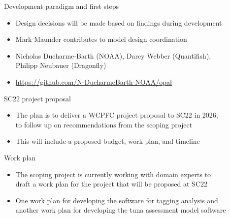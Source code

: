 \documentclass[aspectratio=169]{beamer}
\begin{document}

\begin{frame}{Development paradigm and first steps}\small
  \begin{itemize}
    \item[-] Design decisions will be made based on findings during
    development\\[1.6ex]
    \item[-] Mark Maunder contributes to model design coordination
  \end{itemize}
  \vspace{5ex}
  \begin{itemize}
    \item[-] Nicholas Ducharme-Barth (NOAA), Darcy Webber (Quantifish),\\[0.5ex]
    Philipp Neubauer (Dragonfly)\\[1.2ex]
    \item[] \blue\fns
    \url{https://github.com/N-DucharmeBarth-NOAA/opal}\\[1.2ex]
  \end{itemize}
\end{frame}


\begin{frame}{SC22 project proposal}\small
  \\[2ex]
  \begin{itemize}
    \item[] The plan is to deliver a {\darkgreen WCPFC project proposal to SC22}
    in 2026,\\[0.4ex]
    to follow up on recommendations from the scoping project\\[4ex]
    \item[] This will include a proposed budget, work plan, and timeline
  \end{itemize}
\end{frame}


\begin{frame}{Work plan}\small
  \begin{itemize}
    \item[] The scoping project is currently working with domain
    experts to\\[0.2ex]
    draft a work plan for the project that will be proposed at SC22\\[4ex]
    \item[] One work plan for developing the {\darkgreen software for tagging
      analysis} and\\[0.2ex]
    another work plan for developing the {\darkgreen tuna assessment model
      software}
  \end{itemize}
\end{frame}
\end{document}

